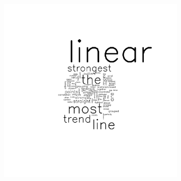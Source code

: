 \documentclass[11pt]{isuthesis}\usepackage[]{graphicx}\usepackage[]{color}
\begin{document}
\begin{figure}[ht]
\begin{subfigure}[t]{0.32\linewidth}
  \includegraphics[width=.75\linewidth]{fig-sentiment-6}
\end{subfigure}


\end{figure}
\end{document}
